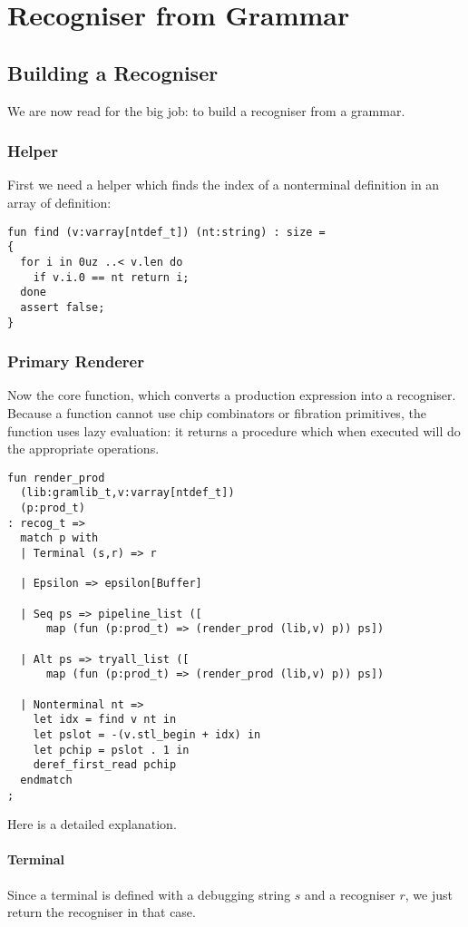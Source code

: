 \documentclass[oneside]{book}
\begin{document}
\chapter{Recogniser from Grammar}
\section{Building a Recogniser}
We are now read for the big job: to build a recogniser from
a grammar.

\subsection{Helper}
First we need a helper which finds the index of a 
nonterminal definition in an array of definition:

\begin{verbatim}
fun find (v:varray[ntdef_t]) (nt:string) : size = 
{
  for i in 0uz ..< v.len do
    if v.i.0 == nt return i;
  done
  assert false;
}
\end{verbatim}


\subsection{Primary Renderer}
Now the core function, which converts a production expression
into a recogniser. Because a function cannot use chip combinators
or fibration primitives, the function uses lazy evaluation: it
returns a procedure which when executed will do the appropriate
operations.

\begin{verbatim}
fun render_prod 
  (lib:gramlib_t,v:varray[ntdef_t]) 
  (p:prod_t) 
: recog_t =>
  match p with
  | Terminal (s,r) => r 

  | Epsilon => epsilon[Buffer] 

  | Seq ps => pipeline_list ([
      map (fun (p:prod_t) => (render_prod (lib,v) p)) ps]) 

  | Alt ps => tryall_list ([
      map (fun (p:prod_t) => (render_prod (lib,v) p)) ps]) 

  | Nonterminal nt => 
    let idx = find v nt in
    let pslot = -(v.stl_begin + idx) in
    let pchip = pslot . 1 in
    deref_first_read pchip
  endmatch
;
\end{verbatim}

Here is a detailed explanation.

\subsubsection{Terminal}
Since a terminal is defined with a debugging string $s$ and
a recogniser $r$, we just return the recogniser in that case.
\end{document}
